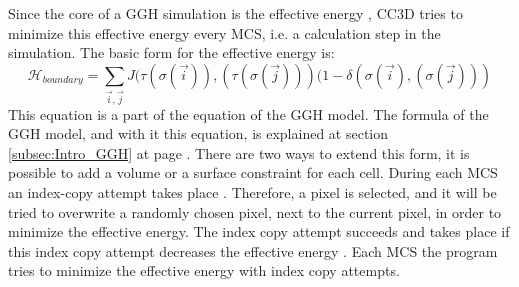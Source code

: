 Since the core of a \ac{GGH} simulation is the effective energy \cite{MaciejH.Swat2017}, \ac{CC3D} tries to minimize this effective energy every \ac{MCS}, i.e. a calculation step in the simulation. The basic form for the effective energy is:
\begin{equation}
\mathcal{H}_{boundary} = \sum_{\vec{i},\vec{j}}^{ }{J(\tau(\sigma(\vec{i})),(\tau(\sigma(\vec{j})))(1-\delta(\sigma(\vec{i}),(\sigma(\vec{j})))}
\end{equation}
This equation is a part of the equation of the \ac{GGH} model. The formula of the \ac{GGH} model, and with it this equation, is explained at section \ref{subsec:Intro_GGH} at page \pageref{subsec:Intro_GGH}. \newline
There are two ways to extend this form, it is possible to add a volume or a surface constraint for each cell. During each \ac{MCS} an index-copy attempt takes place \cite{MaciejH.Swat2017}. Therefore, a pixel is selected, and it will be tried to overwrite a randomly chosen pixel, next to the current pixel, in order to minimize the effective energy. The index copy attempt succeeds and takes place if this index copy attempt decreases the effective energy \cite{MaciejH.Swat2017}. Each \ac{MCS} the program tries to minimize the effective energy with index copy attempts.


